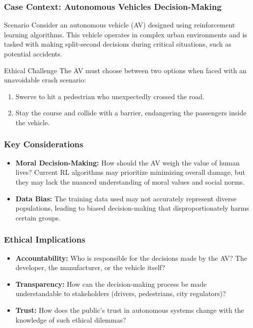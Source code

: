 \documentclass{beamer}
\begin{document}
\begin{frame}[fragile]
    \frametitle{Case Context: Autonomous Vehicles Decision-Making}
    \begin{block}{Scenario}
        Consider an autonomous vehicle (AV) designed using reinforcement learning algorithms. This vehicle operates in complex urban environments and is tasked with making split-second decisions during critical situations, such as potential accidents.
    \end{block}
    
    \begin{block}{Ethical Challenge}
        The AV must choose between two options when faced with an unavoidable crash scenario: 
        \begin{enumerate}
            \item Swerve to hit a pedestrian who unexpectedly crossed the road.
            \item Stay the course and collide with a barrier, endangering the passengers inside the vehicle.
        \end{enumerate}
    \end{block}
\end{frame}

\begin{frame}[fragile]
    \frametitle{Key Considerations}
    \begin{itemize}
        \item \textbf{Moral Decision-Making:} 
        How should the AV weigh the value of human lives? Current RL algorithms may prioritize minimizing overall damage, but they may lack the nuanced understanding of moral values and social norms.
        
        \item \textbf{Data Bias:} 
        The training data used may not accurately represent diverse populations, leading to biased decision-making that disproportionately harms certain groups.
    \end{itemize}
\end{frame}

\begin{frame}[fragile]
    \frametitle{Ethical Implications}
    \begin{itemize}
        \item \textbf{Accountability:} Who is responsible for the decisions made by the AV? The developer, the manufacturer, or the vehicle itself?
        \item \textbf{Transparency:} How can the decision-making process be made understandable to stakeholders (drivers, pedestrians, city regulators)?
        \item \textbf{Trust:} How does the public's trust in autonomous systems change with the knowledge of such ethical dilemmas?
    \end{itemize}
\end{frame}
\end{document}
